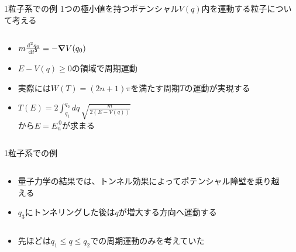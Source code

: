 \documentclass[14pt,aspectratio=169,xcolor=dvipsnames,table,dvipdfmx]{beamer}
\theoremstyle{definition}
\begin{document}
\begin{frame}{1粒子系での例}
  1つの極小値を持つポテンシャル$V(q)$内を運動する粒子について考える
  \begin{columns}[t]
    \begin{column}{.5\textwidth}
      \begin{itemize}
        \item $m\dv[2]{q_0}{t} = -\grad V(q_0)$
        \item $E-V(q)\geq0$の領域で周期運動
        \item 実際には$W(T)=(2n+1)\pi$を満たす周期$T$の運動が実現する
        \item $T(E)=2\int_{q_1}^{q_2}dq\,\sqrt{\frac{m}{2(E-V(q))}}$\\から$E=E_{n}^{~0}$が求まる
      \end{itemize}
    \end{column}
    \begin{column}{.5\textwidth}
    \end{column}
  \end{columns}
\end{frame}

\begin{frame}{1粒子系での例}
  \begin{columns}[t]
    \begin{column}{.5\textwidth}
      \begin{itemize}
        \item 量子力学の結果では、トンネル効果によってポテンシャル障壁を乗り越える
        \item $q_3$にトンネリングした後は$q$が増大する方向へ運動する
      \end{itemize}
    \end{column}
    \begin{column}{.5\textwidth}
    \end{column}
  \end{columns}
  \begin{columns}[t]
    \begin{column}{.9\textwidth}
      \begin{itemize}
        \item 先ほどは$q_1\leq q \leq q_2$での周期運動のみを考えていた
      \end{itemize}
    \end{column}
    \begin{column}{.1\textwidth}
    \end{column}
  \end{columns}

\end{frame}
\end{document}
